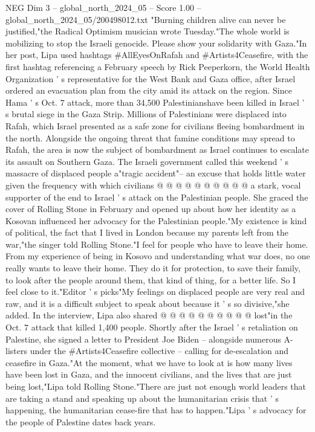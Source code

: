 \begin{textsample}{NEG Dim 3 – global\_north\_2024\_05 – Score 1.00 – global\_north\_2024\_05/200498012.txt}  \label{ex:f3_neg_446}
"Burning children alive can never be justified,"the Radical Optimism musician wrote Tuesday."The whole world is mobilizing to stop the Israeli genocide.
Please show your solidarity with Gaza."In her post, Lipa used hashtags \#AllEyesOnRafah and \#Artists4Ceasefire, with the first hashtag referencing a February speech by Rick Peeperkorn, the World Health Organization ' s representative for the West Bank and Gaza office, after Israel ordered an evacuation plan from the city amid its attack on the region.
Since Hama ' s Oct. 7 attack, more than 34,500 Palestinianshave been killed in Israel ' s brutal siege in the Gaza Strip.
Millions of Palestinians were displaced into Rafah, which Israel presented as a safe zone for civilians fleeing bombardment in the north.
Alongside the ongoing threat that famine conditions may spread to Rafah, the area is now the subject of bombardment as Israel continues to escalate its assault on Southern Gaza.
The Israeli government called this weekend ' s massacre of displaced people a"tragic accident"-- an excuse that holds little water given the frequency with which civilians @ @ @ @ @ @ @ @ @ @ a stark, vocal supporter of the end to Israel ' s attack on the Palestinian people.
She graced the cover of Rolling Stone in February and opened up about how her identity as a Kosovan influenced her advocacy for the Palestinian people."My existence is kind of political, the fact that I lived in London because my parents left from the war,"the singer told Rolling Stone."I feel for people who have to leave their home.
From my experience of being in Kosovo and understanding what war does, no one really wants to leave their home.
They do it for protection, to save their family, to look after the people around them, that kind of thing, for a better life.
So I feel close to it."Editor ' s picks"My feelings on displaced people are very real and raw, and it is a difficult subject to speak about because it ' s so divisive,"she added.
In the interview, Lipa also shared @ @ @ @ @ @ @ @ @ @ lost"in the Oct. 7 attack that killed 1,400 people.
Shortly after the Israel ' s retaliation on Palestine, she signed a letter to President Joe Biden -- alongside numerous A-listers under the \#Artists4Ceasefire collective -- calling for de-escalation and ceasefire in Gaza."At the moment, what we have to look at is how many lives have been lost in Gaza, and the innocent civilians, and the lives that are just being lost,"Lipa told Rolling Stone."There are just not enough world leaders that are taking a stand and speaking up about the humanitarian crisis that ' s happening, the humanitarian cease-fire that has to happen."Lipa ' s advocacy for the people of Palestine dates back years.

\end{textsample}
